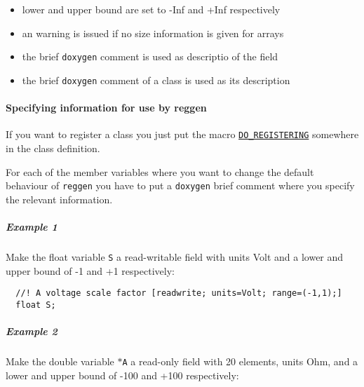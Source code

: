 \begin{itemize}
\item lower and upper bound are set to -Inf and +Inf respectively\end{itemize}


\begin{itemize}
\item an warning is issued if no size information is given for arrays\end{itemize}


\begin{itemize}
\item the brief {\tt doxygen} comment is used as descriptio of the field\end{itemize}


\begin{itemize}
\item the brief {\tt doxygen} comment of a class is used as its description\end{itemize}
\hypertarget{fields_spec}{}\paragraph{Specifying information for use by reggen}\label{fields_spec}
If you want to register a class you just put the macro {\tt \hyperlink{csimclass_8h_a8}{DO\_\-REGISTERING}} somewhere in the class definition.

For each of the member variables where you want to change the default behaviour of {\tt reggen} you have to put a {\tt doxygen} brief comment where you specify the relevant information.\hypertarget{fields_e1}{}\subparagraph{Example 1}\label{fields_e1}
Make the float variable {\tt S} a read-writable field with units Volt and a lower and upper bound of -1 and +1 respectively: 

\footnotesize\begin{verbatim}  //! A voltage scale factor [readwrite; units=Volt; range=(-1,1);]
  float S;
\end{verbatim}
\normalsize
\hypertarget{fields_e2}{}\subparagraph{Example 2}\label{fields_e2}
Make the double variable {\tt $\ast$A} a read-only field with 20 elements, units Ohm, and a lower and upper bound of -100 and +100 respectively: 


